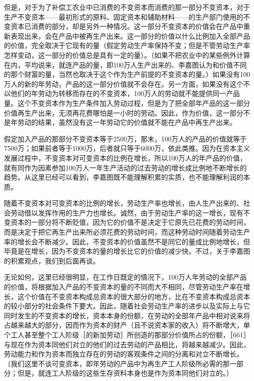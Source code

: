 但是，对于为了补偿工农业中已消费的不变资本而消费的那一部分不变资本，对于生产不变资本——最初形式的原料、固定资本和辅助材料——的生产部门使用的不变资本已消费的部分，却是另外一种情况。这一部分不变资本的价值会在产品中重新表现出来，会在产品中被再生产出来。这一部分的价值以什么比例加入全部产品的价值，完全取决于它现有的量（假定劳动生产率保持不变；但是不管劳动生产率怎样变动，这一部分的价值总是具有一定的量）。（如果不把农业中的某些例外计算在内，平均说来，就连产品的量，即100万人生产出来的、李嘉图认为和价值不同的那个财富的量，当然也取决于这个作为生产前提的不变资本的量。）如果没有100万人的新的年劳动，产品的这一部分价值就不会存在。另一方面，如果没有这个不以他们的年劳动为转移而存在的不变资本，100万人的劳动就不能提供同一产品量。这个不变资本作为生产条件加入劳动过程，但是为了把全部年产品的这一部分价值再生产出来，无须再花费哪怕是一小时的劳动。因此，作为价值，这一部分不是年劳动的结果，虽然没有这一年劳动它的价值就不能在产品中再生产出来。

假定加入产品的那部分不变资本等于2500万，那末，100万人的产品的价值就等于7500万；如果前者等于1000万，后者就只等于6000万，依此类推。因为在资本主义发展过程中，不变资本对可变资本的比例在增长，所以100万人的年产品的价值，就有同作为因素参加100万人一年生产活动的过去劳动的增长成比例地不断增长的趋势。从这里已经可以看到，李嘉图既不能理解积累的实质，也不能理解利润的本质。

随着不变资本对可变资本的比例的增长，劳动生产率也增长，由人生产出来的、社会劳动借以发挥作用的生产力也增长。诚然，由于劳动生产率的这一增长，现有不变资本的一部分将不断贬值，因为它的价值不是决定于它原先已花费的劳动时间，而是决定于把它再生产出来所必须花费的劳动时间，而这种劳动时间随着劳动生产率的增长会不断减少。因此，不变资本的价值虽然不是同它的量成比例地增长，但毕竟是在增长，因为不变资本的量的增长比它的价值的减少快。不过，关于李嘉图的积累观点，我们到后面再谈。

无论如何，这里已经很明显，在工作日既定的情况下，100万人年劳动的全部产品的价值，将根据加入产品的不变资本的量的不同而大不相同，尽管劳动生产率在增长，这个价值在不变资本构成总资本的很大部分的地方，比在不变资本构成总资本的较小部分的社会条件下要大。因此，随着社会劳动生产率的进步以及实际上与它同时发生的不变资本的增长，资本本身的份额，在劳动的全部年产品中相对说来将占越来越大的部分，因而作为资本的财产（且不说资本家的收入）将不断增大，单个工人甚至整个工人阶级［的新加劳动］所创造的那部分价值所占的份额，［661］与现在作为资本同他们对立的他们的过去劳动的产品相比，将越来越减少。因此，劳动能力和作为资本而独立存在的劳动的客观条件之间的分离和对立不断增长。（我们这里不谈可变资本，即年劳动的产品中为再生产工人阶级所必需的那一部分；但是，就连工人阶级的这些生存资料本身也是作为资本同他们对立的。）

